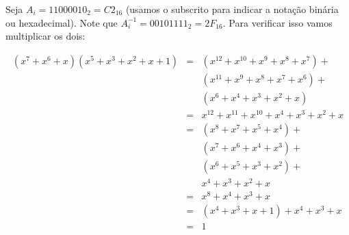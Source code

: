 \begin{example}
Seja $A_i = 11000010_2 = C2_{16}$ (usamos o subscrito para indicar a notação binária ou hexadecimal).
Note que $A_i^{-1} = 00101111_2 = 2F_{16}$.
Para verificar isso vamos multiplicar os dois:

\begin{eqnarray*}
  (x^7 + x^6 + x)(x^5 + x^3 + x^2 + x + 1) & = & (x^{12} + x^{10} + x^9 + x^8 + x^7) + \\
  &   & (x^{11} + x^9 + x^8 + x^7 + x^6) + \\
  &   & (x^6 + x^4 + x^3 + x^2 + x)\\
  & = & x^{12} + x^{11} + x^{10} + x^4 + x^3 + x^2 + x\\
  & = & (x^8 + x^7 + x^5 + x^4) + \\
  &   & (x^7 + x^6 + x^4 + x^3) + \\
  &   & (x^6 + x^5 + x^3 + x^2) + \\
  &   & x^4 + x^3 + x^2 + x\\
  & = & x^8 + x^4 + x^3 + x\\
  & = & (x^4 + x^3 + x + 1) + x^4 + x^3 + x\\
  & = & 1
\end{eqnarray*}
  

\end{example}
